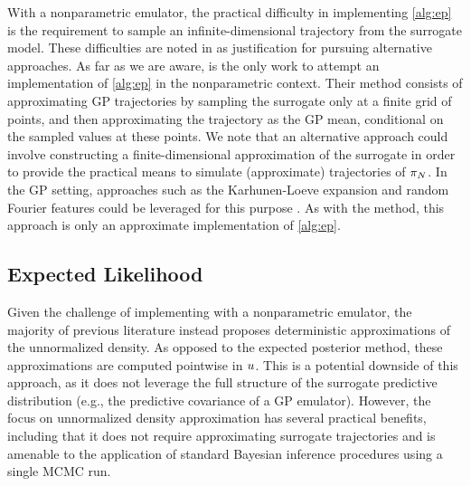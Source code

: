 \documentclass[12pt]{article}
\begin{document}
With a nonparametric emulator, the practical difficulty in 
implementing \cref{alg:ep} is the requirement to sample an infinite-dimensional 
trajectory from the surrogate model.
These difficulties are noted in \citet{VehtariParallelGP} as justification for pursuing alternative 
approaches. As far as we are aware, \citet{trainDynamics} is the only work to attempt an 
implementation of \cref{alg:ep} in the nonparametric context. Their method consists of approximating GP 
trajectories by sampling the surrogate only at a finite grid of points, and then approximating 
the trajectory as the GP mean, conditional on the sampled values at these points.
We note that an alternative approach could involve constructing a finite-dimensional approximation 
of the surrogate in order to provide the practical means to simulate (approximate) trajectories 
of $\postEm[\Ndesign]$. In the GP setting, approaches such as the Karhunen-Loeve expansion 
and random Fourier features could be leveraged for this purpose \citep{dimRedPolyChaos,samplingGPPosts}. 
As with the \citet{trainDynamics} method, this approach is only an approximate implementation of \cref{alg:ep}.

\subsection{Expected Likelihood}
Given the challenge of implementing  with a nonparametric emulator, the majority of 
previous literature instead proposes deterministic approximations of the unnormalized
density. As opposed to the expected posterior method, these approximations are computed 
pointwise in $\Par$. This is a potential downside of this approach, as it does not leverage 
the full structure of the surrogate predictive distribution (e.g., the predictive covariance of a GP emulator).
However, the focus on unnormalized density approximation has several practical benefits, 
including that it does not require approximating surrogate trajectories and is amenable to the application of 
standard Bayesian inference procedures using a single MCMC run.
\end{document}
